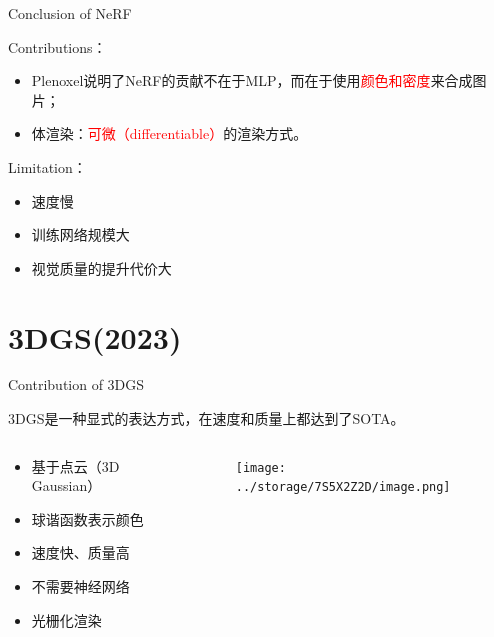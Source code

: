 \documentclass[dark]{sintefbeamer}
\begin{document}
\begin{frame}[fragile]{Conclusion of NeRF}

  Contributions：
  \begin{itemize}
    \item Plenoxel说明了NeRF的贡献不在于MLP，而在于使用\textcolor{red}{颜色和密度}来合成图片；
    \item 体渲染：\textcolor{red}{可微（differentiable）}的渲染方式。
  \end{itemize}
  Limitation：
  \begin{itemize}
    \item 速度慢
    \item 训练网络规模大
    \item 视觉质量的提升代价大
  \end{itemize}

\end{frame}

\section{3DGS(2023)}

\begin{frame}[fragile]{Contribution of 3DGS}

3DGS\cite{kerbl3DGaussianSplatting2023}是一种显式的表达方式，在速度和质量上都达到了SOTA。

\begin{columns}
  \begin{column}{0.3\textwidth}
    \begin{itemize}
      \item 基于点云（3D Gaussian）
      \item 球谐函数表示颜色
      \item 速度快、质量高
      \item 不需要神经网络
      \item 光栅化渲染
    \end{itemize}
  \end{column}

  \begin{column}{0.7\textwidth}
    \begin{figure}
      \texttt{[image: ../storage/7S5X2Z2D/image.png]}
    \end{figure}
  \end{column}
\end{columns}
  
\end{frame}
\end{document}
